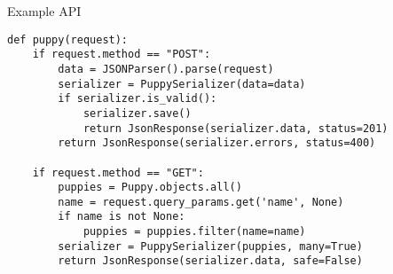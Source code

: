 \begin{frame}[fragile]{Example API}
    \begin{verbatim}
def puppy(request):
    if request.method == "POST":
        data = JSONParser().parse(request)
        serializer = PuppySerializer(data=data)
        if serializer.is_valid():
            serializer.save()
            return JsonResponse(serializer.data, status=201)
        return JsonResponse(serializer.errors, status=400)

    if request.method == "GET":
        puppies = Puppy.objects.all()
        name = request.query_params.get('name', None)
        if name is not None:
            puppies = puppies.filter(name=name)
        serializer = PuppySerializer(puppies, many=True)
        return JsonResponse(serializer.data, safe=False)
    \end{verbatim}
\end{frame}
